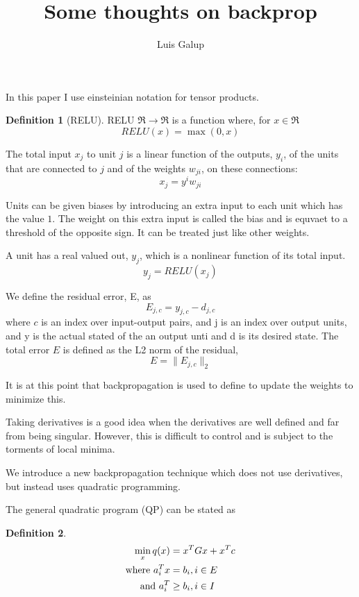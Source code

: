 \documentclass[11pt]{amsart}
\title{Some thoughts on backprop}
\author{Luis Galup}
\date{}
\theoremstyle{definition}
\newtheorem{definition}{Definition}[section]
\begin{document}
\maketitle

In this paper I use einsteinian notation for tensor products.

\begin{definition}[RELU]
RELU $\Re \rightarrow \Re$ is a function where, for $x \in \Re$
\[
	RELU(x) = \max(0,x)
\]
\end{definition}

The total input $x_j$ to unit $j$ is a linear function of the outputs, $y_i$, of the units that are connected to $j$ and of the weights $w_{ji}$, on these connections:
\[
	x_j = y^iw_{ji}
\]

Units can be given biases by introducing an extra input to each unit which has the value $1$. The weight on this extra input is called the bias and is equvaet to a threshold of the opposite sign. It can be treated just like other weights.

A unit has a real valued out, $y_j$, which is a nonlinear function of its total input.
\[
	y_j = RELU(x_j)
\]

We define the residual error, E, as
\[
	E_{j,c} = y_{j,c} - d_{j,c}
\]
where $c$ is an index over input-output pairs, and j is an index over output units, and y is the actual stated of the an output unti and d is its desired state. 
The total error $E$ is defined as the L2 norm of the residual,
\[
	E = \| E_{j,c} \|_2
\]

It is at this point that backpropagation is used to define to update the weights to minimize this. 

Taking derivatives is a good idea when the derivatives are well defined and far from being singular. However, this is difficult to control and is subject to the torments of local minima.


We introduce a new backpropagation technique which does not use derivatives, but instead uses quadratic programming. 

The general quadratic program (QP) can be stated as 
\begin{definition}
\begin{align}
\min_x q(x)  & =  x^T G x + x^Tc \\
\hbox{where } a_i^Tx & = b_i, i \in E \\
\hbox{and } a_i^T & \geq b_i, i \in I
\end{align}
\end{definition}
\end{document}
